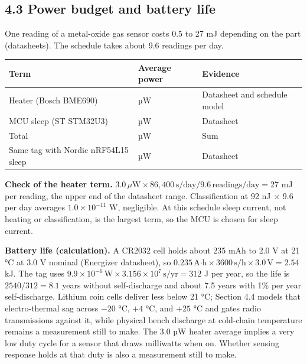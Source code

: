 \documentclass[10pt,letterpaper]{article}
\newcounter{none}
\begin{document}
\subsection{4.3 Power budget and battery
life}\label{power-budget-and-battery-life}

One reading of a metal-oxide gas sensor costs 0.5 to 27 mJ depending on
the part (datasheets). The schedule takes about 9.6 readings per day.

{\def\LTcaptype{none} %
{\footnotesize\setlength{\tabcolsep}{3.8pt}\renewcommand{\arraystretch}{1.15}
\begin{longtable}[]{@{}
  >{\raggedright\arraybackslash}p{}
  >{\raggedright\arraybackslash}p{}
  >{\raggedright\arraybackslash}p{}@{}}
\toprule\noalign{}
\begin{minipage}[b]{\linewidth}\raggedright
\textbf{Term}
\end{minipage} & \begin{minipage}[b]{\linewidth}\raggedright
\textbf{Average power}
\end{minipage} & \begin{minipage}[b]{\linewidth}\raggedright
\textbf{Evidence}
\end{minipage} \\
\midrule\noalign{}
\endhead
\bottomrule\noalign{}
\endlastfoot
Heater (Bosch BME690) & 3.0 µW & Datasheet and schedule model \\
MCU sleep (ST STM32U3) & 6.9 µW & Datasheet \\
Total & 9.9 µW & Sum \\
Same tag with Nordic nRF54L15 sleep & 5.1 µW & Datasheet \\
\end{longtable}
}
}

\textbf{Check of the heater term.}
\(3.0\,\mu\text{W} \times 86{,}400\,\text{s/day} / 9.6\,\text{readings/day} = 27\)
mJ per reading, the upper end of the datasheet range. Classification at
92 nJ × 9.6 per day averages \(1.0 \times 10^{-11}\) W, negligible. At
this schedule sleep current, not heating or classification, is the
largest term, so the MCU is chosen for sleep current.

\textbf{Battery life (calculation).} A CR2032 cell holds about 235 mAh
to 2.0 V at 21 °C at 3.0 V nominal (Energizer datasheet), so
\(0.235\,\text{A·h} \times 3600\,\text{s/h} \times 3.0\,\text{V} = 2.54\)
kJ. The tag uses
\(9.9 \times 10^{-6}\,\text{W} \times 3.156 \times 10^7\,\text{s/yr} = 312\)
J per year, so the life is \(2540 / 312 = 8.1\) years without
self-discharge and about 7.5 years with 1\% per year self-discharge.
Lithium coin cells deliver less below 21 °C; Section 4.4 models that
electro-thermal sag across \(-20\text{ °C}\), \(+4\text{ °C}\), and
\(+25\text{ °C}\) and gates radio transmissions against it, while
physical bench discharge at cold-chain temperature remains a measurement
still to make. The 3.0 µW heater average implies a very low duty cycle
for a sensor that draws milliwatts when on. Whether sensing response
holds at that duty is also a measurement still to make.
\end{document}
